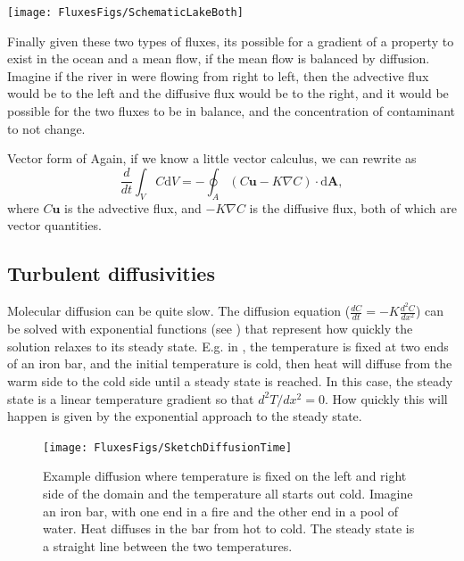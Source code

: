 \begin{marginfigure}
    \texttt{[image: FluxesFigs/SchematicLakeBoth]}
    \caption{Information needed for mass budget across a surface leading out of a lake.}
\end{marginfigure}

Finally given these two types of fluxes, its possible for a gradient of a property to exist in the ocean and a mean flow, if the mean flow is balanced by diffusion.  Imagine if the river in  were flowing from right to left, then the advective flux would be to the left and the diffusive flux would be to the right, and it would be possible for the two fluxes to be in balance, and the concentration of contaminant to not change.  

\begin{derivbox}[label={box:volumeintegralboth}]{Vector form of }
Again, if we know a little vector calculus, we can rewrite  as 
   \begin{equation}
        \frac{d}{dt}\int_V C \mathrm{d}V = - \oint_A \left(C \mathbf{u} - K\nabla C\right)\cdot \mathrm{d}\mathbf{A},
    \end{equation} 
where $C\mathbf{u}$ is the advective flux, and $-K\nabla C$ is the diffusive flux, both of which are vector quantities.  
\end{derivbox}

\subsection{Turbulent diffusivities}


Molecular diffusion can be quite slow.  The diffusion equation ($\frac{dC}{dt} = -K \frac{d^2 C}{dx^2}$) can be solved with exponential functions (see ) that represent how quickly the solution relaxes to its steady state.  E.g. in , the temperature is fixed at two ends of an iron bar, and the initial temperature is cold, then heat will diffuse from the warm side to the cold side until a steady state is reached.  In this case, the steady state is a linear temperature gradient so that $d^2 T/dx^2 = 0$.  How quickly this will happen is given by the exponential approach to the steady state.

\begin{figure}[hbt]
  \begin{center}
    \texttt{[image: FluxesFigs/SketchDiffusionTime]}
    \caption{Example diffusion where temperature is fixed on the left and right side of the domain and the temperature all starts out cold.  Imagine an iron bar, with one end in a fire and the other end in a pool of water.  Heat diffuses in the bar from hot to  cold.  The steady state is a straight line between the two temperatures.}
    \label{fig:SketchDiffusionTime}  
  \end{center}
\end{figure}

